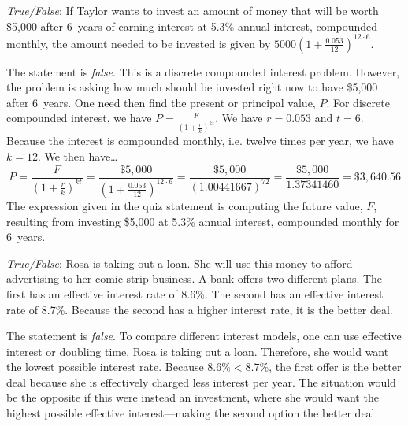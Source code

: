 \documentclass[11pt,letterpaper]{article}
\begin{document}
\quizsol \textit{True/False}: If Taylor wants to invest an amount of money that will be worth \$5,000 after 6~years of earning interest at 5.3\% annual interest, compounded monthly, the amount needed to be invested is given by $5000 \left(1 + \frac{0.053}{12} \right)^{12 \cdot 6}$. \pspace

\sol The statement is \textit{false}. This is a discrete compounded interest problem. However, the problem is asking how much should be invested right now to have \$5,000 after 6~years. One need then find the present or principal value, $P$. For discrete compounded interest, we have $P= \frac{F}{\left(1 + \frac{r}{k} \right)^{kt}}$. We have $r= 0.053$ and $t= 6$. Because the interest is compounded monthly, i.e. twelve times per year, we have $k= 12$. We then have\dots
	\[
	P= \dfrac{F}{\left(1 + \frac{r}{k} \right)^{kt}}= \dfrac{\$5,\!000}{\left(1 + \frac{0.053}{12} \right)^{12 \cdot 6}}= \dfrac{\$5,\!000}{(1.00441667)^{72}}= \dfrac{\$5,\!000}{1.37341460}= \$3,\!640.56
	\]
The expression given in the quiz statement is computing the future value, $F$, resulting from investing \$5,000 at 5.3\% annual interest, compounded monthly for 6~years. \pvspace{1.3cm}



\quizsol \textit{True/False}: Rosa is taking out a loan. She will use this money to afford advertising to her comic strip business. A bank offers two different plans. The first has an effective interest rate of 8.6\%. The second has an effective interest rate of 8.7\%. Because the second has a higher interest rate, it is the better deal. \pspace

\sol The statement is \textit{false}. To compare different interest models, one can use effective interest or doubling time. Rosa is taking out a loan. Therefore, she would want the lowest possible interest rate. Because $8.6\% < 8.7\%$, the first offer is the better deal because she is effectively charged less interest per year. The situation would be the opposite if this were instead an investment, where she would want the highest possible effective interest---making the second option the better deal. 
\end{document}
